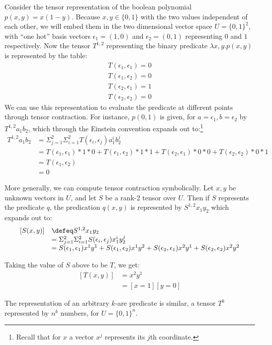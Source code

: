 \begin{example}\label{ex:tc-1}
  Consider the tensor representation of the boolean polynomial \(p(x,y) = x(1-y)\). Because \(x,y\in \{0,1\}\) with the two values independent of each other, we will embed them in the two dimensional vector space \(U=\{0,1\}^2\), with ``one hot'' basis vectors \(\epsilon_1=(1,0)\) and \(\epsilon_2=(0,1)\) representing \(0\) and \(1\) respectively. Now the tensor \(T^{1,2}\) representing the binary predicate \(\lambda x,y. p(x,y)\) is represented by the table:
  \[
  \begin{array}{l}
    T(\epsilon_1,\epsilon_1)=0\\
    T(\epsilon_1,\epsilon_2)=0\\
    T(\epsilon_2,\epsilon_1)=1\\
    T(\epsilon_2,\epsilon_2)=0
  \end{array}
  \]
  We can use this representation to evaluate the predicate at different points through tensor contraction. For instance, \(p(0,1)\) is given, for \(a=\epsilon_1,b=\epsilon_2\) by \(T^{1,2}a_1 b_2\), which through the Einstein convention expands out to:\footnote{Recall that for \(x\) a vector \(x^j\) represents its \(j\)th coordinate.}
  \[\begin{array}{ll}
  T^{1,2}a_1 b_2 &= \Sigma_{j=1}^2 \Sigma_{i=1}^2 T(\epsilon_i,\epsilon_j)a_1^ib_2^j \\
  &= T(\epsilon_1,\epsilon_1)*1*0 + T(\epsilon_1,\epsilon_2)*1*1 +
  T(\epsilon_2,\epsilon_1)*0*0 + T(\epsilon_2,\epsilon_2)*0*1 \\
  & =T(\epsilon_1,\epsilon_2)\\
  & = 0
  \end{array}
  \]
\end{example}

More generally, we can compute tensor contraction symbolically. Let \(x,y\) be  unknown vectors in \(U\), and let \(S\) be a rank-2 tensor over \(U\). Then if \(S\) represents the predicate \(q\), the predication \(q(x,y)\) is represented by \(S^{1,2}x_1 y_2\) which expands out to:
\[\begin{array}{ll}
  [S(x,y)]&\defeq  S^{1,2}x_1 y_2\\
  & = \Sigma_{j=1}^2 \Sigma_{i=1}^2 S(\epsilon_i,\epsilon_j)x_1^iy_2^j \\
  & =S(\epsilon_1,\epsilon_1)x^1y^1 + S(\epsilon_1,\epsilon_2)x^1y^2 +
      S(\epsilon_2,\epsilon_1)x^2y^1 + S(\epsilon_2,\epsilon_2)x^2y^2 \\
  \end{array}
  \]

  \begin{example}
    Taking the value of \(S\) above to be \(T\), we get:
    \[\begin{array}{ll}    
        [T(x,y)] & = x^2y^1\\
         & = [x=1][y=0]
    \end{array}
    \]
  \end{example}

The representation of an arbitrary $k$-are predicate is similar, a tensor \(T^k\) represented by \(n^k\) numbers, for \(U=\{0,1\}^n\). 

